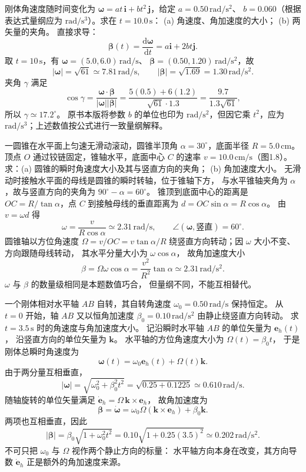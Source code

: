 刚体角速度随时间变化为
$\bm\omega=at\,\bm i+bt^2\,\bm j$，给定
$a=0.50\,\mathrm{rad/s^2}$、
$b=0.060$（根据表达式量纲应为
$\mathrm{rad/s^3}$）。求在 $t=10.0\,\mathrm s$：
(a) 角速度、角加速度的大小；
(b) 两矢量的夹角。
\exsolution
直接求导：
\[
 \bm\beta(t)=\frac{\mathrm d\bm\omega}{\mathrm dt}
 =a\bm i+2bt\bm j.
\]
取 $t=10\,\mathrm s$，有
$\bm\omega=(5.0,6.0)\,\mathrm{rad/s}$、
$\bm\beta=(0.50,1.20)\,\mathrm{rad/s^2}$，故
\[
 \boxed{|\bm\omega|=\sqrt{61}\simeq7.81\,\mathrm{rad/s},\qquad
 |\bm\beta|=\sqrt{1.69}=1.30\,\mathrm{rad/s^2}.}
\]
夹角 $\gamma$ 满足
\[
 \cos\gamma=\frac{\bm\omega\cdot\bm\beta}
 {|\bm\omega||\bm\beta|}
 =\frac{5(0.5)+6(1.2)}{\sqrt{61}\cdot1.3}
 =\frac{9.7}{1.3\sqrt{61}},
\]
所以 $\boxed{\gamma\simeq17.2^\circ}$。
\excheck 原书本版将参数 $b$ 的单位也印为
$\mathrm{rad/s^2}$，但因它乘 $t^2$，应为
$\mathrm{rad/s^3}$；上述数值按公式进行一致量纲解释。

一圆锥在水平面上匀速无滑动滚动，圆锥半顶角
$\alpha=30^\circ$，底面半径 $R=5.0\,\mathrm{cm}$。
顶点 $O$ 通过铰链固定，锥轴水平，底面中心 $C$ 的速率
$v=10.0\,\mathrm{cm/s}$（图1.8）。
求：(a) 圆锥的瞬时角速度大小及其与竖直方向的夹角；
(b) 角加速度大小。
\exsolution
无滑动时接触水平面的母线是圆锥的瞬时转轴，位于锥轴下方，
与水平锥轴夹角为 $\alpha$，故与竖直方向的夹角为
$90^\circ-\alpha=60^\circ$。
锥顶到底面中心的距离是
$OC=R/\tan\alpha$，点 $C$ 到接触母线的垂直距离为
$d=OC\sin\alpha=R\cos\alpha$。
由 $v=\omega d$ 得
\[
 \boxed{\omega=\frac v{R\cos\alpha}
 \simeq2.31\,\mathrm{rad/s},\qquad
 \angle(\bm\omega,\text{竖直})=60^\circ.}
\]
圆锥轴以方位角速度
$\Omega=v/OC=v\tan\alpha/R$
绕竖直方向转动；因 $\omega$ 大小不变、方向跟随母线转动，
其水平分量大小为 $\omega\cos\alpha$，
故角加速度大小
\[
 \boxed{\beta=\Omega\omega\cos\alpha
 =\frac{v^2}{R^2}\tan\alpha
 \simeq2.31\,\mathrm{rad/s^2}.}
\]
\excheck $\omega$ 与 $\beta$ 的数量级相同是本题数值巧合，
但量纲不同，不能互相替代。

一个刚体相对水平轴 $AB$ 自转，其自转角速度
$\omega_0=0.50\,\mathrm{rad/s}$ 保持恒定。
从 $t=0$ 开始，轴 $AB$ 又以恒角加速度
$\beta_0=0.10\,\mathrm{rad/s^2}$
由静止绕竖直方向转动。
求 $t=3.5\,\mathrm s$ 时的角速度与角加速度大小。
\exsolution
记沿瞬时水平轴 $AB$ 的单位矢量为 $\bm e_h(t)$，
沿竖直方向的单位矢量为 $\bm k$。
水平轴的方位角速度大小为 $\Omega(t)=\beta_0t$，
于是刚体总瞬时角速度为
\[
 \bm\omega(t)=\omega_0\bm e_h(t)+\Omega(t)\bm k.
\]
由于两分量互相垂直，
\[
 \boxed{|\bm\omega|=\sqrt{\omega_0^2+\beta_0^2t^2}
 =\sqrt{0.25+0.1225}\simeq0.610\,\mathrm{rad/s}.}
\]
随轴旋转的单位矢量满足
$\dot{\bm e}_h=\Omega\,\bm k\times\bm e_h$，
故角加速度为
\[
 \bm\beta=\dot{\bm\omega}
 =\omega_0\Omega(\bm k\times\bm e_h)+\beta_0\bm k.
\]
两项也互相垂直，因此
\[
 \boxed{|\bm\beta|=\beta_0\sqrt{1+\omega_0^2t^2}
 =0.10\sqrt{1+0.25(3.5)^2}
 \simeq0.202\,\mathrm{rad/s^2}.}
\]
\excheck 不可只把 $\omega_0$ 与 $\Omega$ 视作两个静止方向的标量：
水平轴方向本身在改变，其方向导数
$\dot{\bm e}_h$ 正是额外的角加速度来源。
